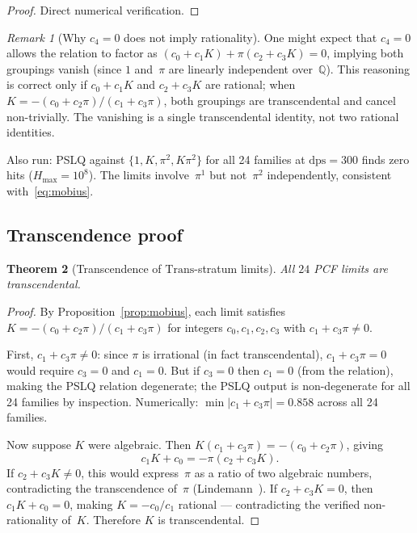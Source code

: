 \documentclass[12pt, reqno]{amsart}
\newtheorem{theorem}{Theorem}[section]
\theoremstyle{definition}
\theoremstyle{remark}
\newtheorem{remark}[theorem]{Remark}
\newcommand{\Trans}{\mathrm{Trans}}
\begin{document}
\begin{proof}
Direct numerical verification.
\end{proof}

\begin{remark}[Why $c_4 = 0$ does not imply rationality]\label{rem:c4zero}
One might expect that
$c_4 = 0$ allows the relation to factor as $(c_0 + c_1 K) + \pi(c_2 + c_3 K) = 0$,
implying both groupings vanish (since $1$ and~$\pi$ are linearly independent over~$\mathbb{Q}$).
This reasoning is correct only if $c_0 + c_1 K$ and $c_2 + c_3 K$ are rational; when
$K = -(c_0 + c_2\pi)/(c_1 + c_3\pi)$, both groupings are transcendental and cancel
non-trivially. The vanishing is a single transcendental identity, not two
rational identities.

Also run: PSLQ against $\{1, K, \pi^2, K\pi^2\}$ for all 24 families at $\mathrm{dps}=300$
finds zero hits ($H_{\max}=10^8$). The limits involve~$\pi^1$ but not~$\pi^2$ independently,
consistent with~\eqref{eq:mobius}.
\end{remark}

\subsection{Transcendence proof}\label{ssec:transcendence}

\begin{theorem}[Transcendence of $\Trans$-stratum limits]\label{thm:trans}
All $24$ PCF limits
are transcendental.
\end{theorem}

\begin{proof}
By Proposition~\ref{prop:mobius}, each limit satisfies $K = -(c_0 + c_2\pi)/(c_1 + c_3\pi)$
for integers $c_0, c_1, c_2, c_3$ with $c_1 + c_3\pi \ne 0$.

First, $c_1 + c_3\pi \ne 0$: since $\pi$ is irrational (in fact transcendental), $c_1 + c_3\pi = 0$
would require $c_3 = 0$ and $c_1 = 0$. But if $c_3 = 0$ then $c_1 = 0$ (from the relation),
making the PSLQ relation degenerate; the PSLQ output is non-degenerate for all 24
families by inspection. Numerically: $\min|c_1 + c_3\pi| = 0.858$ across all 24 families.

Now suppose $K$ were algebraic. Then $K(c_1 + c_3\pi) = -(c_0 + c_2\pi)$, giving
\[
  c_1 K + c_0 = -\pi(c_2 + c_3 K).
\]
If $c_2 + c_3 K \ne 0$, this would express~$\pi$ as a ratio of two algebraic numbers,
contradicting the transcendence of~$\pi$ (Lindemann~\cite{lindemann}). If $c_2 + c_3 K = 0$,
then $c_1 K + c_0 = 0$, making $K = -c_0/c_1$ rational --- contradicting the verified
non-rationality of~$K$. Therefore $K$ is transcendental.
\end{proof}
\end{document}
